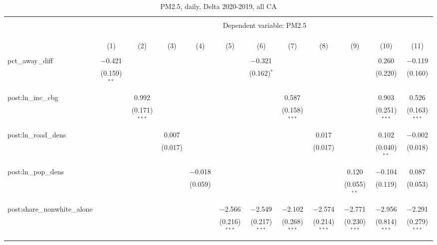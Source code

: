 
\begin{table}[!htbp] \centering 
  \caption{PM2.5, daily, Delta 2020-2019, all CA} 
  \label{} 
\begin{tabular}{@{\extracolsep{5pt}}lccccccccccc} 
\\[-1.8ex]\hline 
\hline \\[-1.8ex] 
 & \multicolumn{11}{c}{Dependent variable: PM2.5} \\ 
\cline{2-12} 
\\[-1.8ex] & \multicolumn{11}{c}{} \\ 
\\[-1.8ex] & (1) & (2) & (3) & (4) & (5) & (6) & (7) & (8) & (9) & (10) & (11)\\ 
\hline \\[-1.8ex] 
 pct\_away\_diff & $-$0.421 &  &  &  &  & $-$0.321 &  &  &  & 0.260 & $-$0.119 \\ 
  & (0.159)$^{**}$ &  &  &  &  & (0.162)$^{*}$ &  &  &  & (0.220) & (0.160) \\ 
  & & & & & & & & & & & \\ 
 post:ln\_inc\_cbg &  & 0.992 &  &  &  &  & 0.587 &  &  & 0.903 & 0.526 \\ 
  &  & (0.171)$^{***}$ &  &  &  &  & (0.158)$^{***}$ &  &  & (0.251)$^{***}$ & (0.163)$^{***}$ \\ 
  & & & & & & & & & & & \\ 
 post:ln\_road\_dens &  &  & 0.007 &  &  &  &  & 0.017 &  & 0.102 & $-$0.002 \\ 
  &  &  & (0.017) &  &  &  &  & (0.017) &  & (0.040)$^{**}$ & (0.018) \\ 
  & & & & & & & & & & & \\ 
 post:ln\_pop\_dens &  &  &  & $-$0.018 &  &  &  &  & 0.120 & $-$0.104 & 0.087 \\ 
  &  &  &  & (0.059) &  &  &  &  & (0.055)$^{**}$ & (0.119) & (0.053) \\ 
  & & & & & & & & & & & \\ 
 post:share\_nonwhite\_alone &  &  &  &  & $-$2.566 & $-$2.549 & $-$2.102 & $-$2.574 & $-$2.771 & $-$2.956 & $-$2.291 \\ 
  &  &  &  &  & (0.216)$^{***}$ & (0.217)$^{***}$ & (0.268)$^{***}$ & (0.214)$^{***}$ & (0.230)$^{***}$ & (0.814)$^{***}$ & (0.279)$^{***}$ \\ 
  & & & & & & & & & & & \\ 

\end{tabular}
\end{table}
